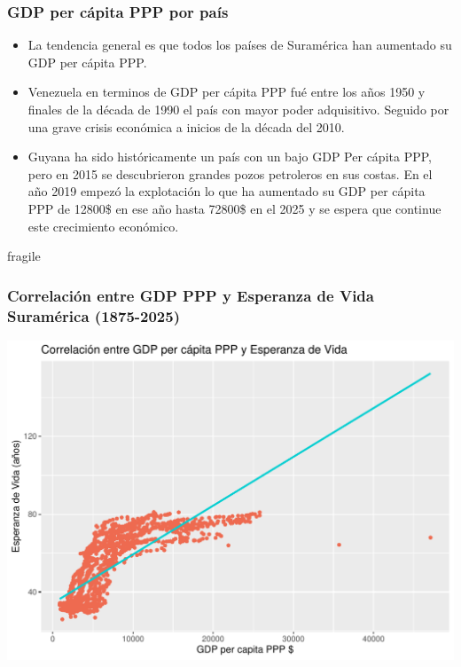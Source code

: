\documentclass{beamer}
\begin{document}
\begin{frame}[fragile]
\frametitle{GDP per cápita PPP por país}

\begin{itemize}
\item<1> La tendencia general es que todos los países de Suramérica han aumentado su GDP per cápita PPP.

\item<2> Venezuela en terminos de GDP per cápita PPP fué entre los años 1950 y finales de la década de 1990 el país con mayor poder adquisitivo. Seguido por una grave crisis económica a inicios de la década del 2010.

\item<3> Guyana ha sido históricamente un país con un bajo GDP Per cápita PPP, pero en 2015 se descubrieron grandes pozos petroleros en sus costas. En el año 2019 empezó la explotación lo que ha aumentado su GDP per cápita PPP de 12800\$ en ese año hasta 72800\$ en el 2025 y se espera que continue este crecimiento económico.

\end{itemize}
\end{frame}


\begin{frame}{fragile}
\frametitle{Correlación entre GDP  PPP y Esperanza de Vida Suramérica (1875-2025)}

\includegraphics{presentacion_Parada_G_M8R2-005}

\end{frame}
\end{document}
